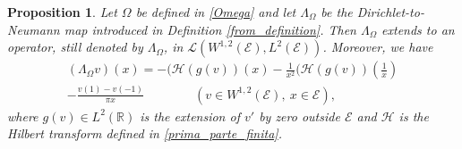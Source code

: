 \documentclass{amsart} %
\numberwithin{equation}{section}
\newtheorem{proposition}[theorem]{Proposition}
\theoremstyle{definition}
\begin{document}
\begin{proposition}\label{formula_hilbert}
Let $\Omega$ be defined in  \eqref{Omega} and let $\Lambda_\Omega$ be the Dirichlet-to-Neumann map
introduced in Definition \ref{from_definition}.
Then $\Lambda_\Omega$ extends to an operator, still denoted by $\Lambda_\Omega$, in $\mathcal{L}(W^{1,2}(\mathcal{E}),L^2(\mathcal{E}))$. Moreover, we have
\begin{multline}\label{Mare_Formula}
\left(\Lambda_\Omega v\right)(x)=-(\mathcal{H}(g(v))(x) - \frac{1}{x^2} (\mathcal{H}(g(v))\left(\frac1x\right)\\
-\frac{v(1)-v(-1)}{\pi x} \qquad\qquad(v\in W^{1,2}(\mathcal{E}),\ x\in \mathcal{E}),
\end{multline}
where  $g(v)\in L^2(\mathbb{R})$ is the extension of $v'$ by zero outside $\mathcal{E}$ and $\mathcal{H}$ is the Hilbert transform defined in \eqref{prima_parte_finita}.
\end{proposition}
\end{document}
